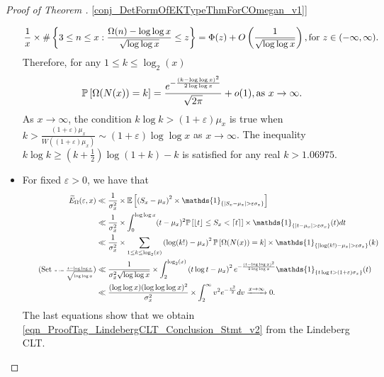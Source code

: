 \documentclass[11pt,reqno,a4letter]{article}
\newcommand{\hlocalref}[1]{\hyperref[#1]{\ref{#1}}}
\numberwithin{equation}{section}
\numberwithin{figure}{section}
\numberwithin{table}{section}
\newcommand{\floor}[1]{\left\lfloor #1 \right\rfloor}
\newcommand{\ceiling}[1]{\left\lceil #1 \right\rceil}
\theoremstyle{plain}
\numberwithin{theorem}{section}
\theoremstyle{definition}
\theoremstyle{remark}
\newcommand{\mathtext}[1]{\text{\rm #1}}
\begin{document}
\begin{proof}[Proof of Theorem \hlocalref{conj_DetFormOfEKTypeThmForCOmegan_v1}]
\begin{itemize}
\cite[Thm.~7.21; \S 7.4]{MV} 
\[
\frac{1}{x} \times \#\left\{3 \leq n \leq x: \frac{\Omega(n) - \log\log x}{\sqrt{\log\log x}} \leq z\right\} = 
     \Phi(z) + O\left(\frac{1}{\sqrt{\log\log x}}\right), \mathtext{ for } z \in (-\infty, \infty). 
\]
Therefore, for any $1 \leq k \leq \log_2(x)$ 
\[
\mathbb{P}\left[\Omega(N(x)) = k\right] = 
     \frac{e^{-\frac{(k-\log\log x)^2}{2\log\log x}}}{\sqrt{2\pi}} + o(1), 
     \mathtext{ as } x \rightarrow \infty. 
\]
As $x \rightarrow \infty$, the condition $k\log k > (1+\varepsilon) \mu_x$ is true when 
$k > \frac{(1+\varepsilon) \mu_x}{W\left((1+\varepsilon) \mu_x\right)} \sim (1+\varepsilon) \log\log x$ 
as $x \rightarrow \infty$. 
The inequality $k\log k \geq \left(k + \frac{1}{2}\right) \log(1+k) - k$ 
is satisfied for any real $k > 1.06975$. 
\item 
For fixed $\varepsilon > 0$, we have that 
\begin{align*}
\widetilde{E}_{\Omega}(\varepsilon, x) & \ll 
     \frac{1}{\sigma_x^2} \times \mathbb{E}\left[
     \left(S_x - \mu_x\right)^2 \times \mathds{1}_{\left\{\left\lvert S_x - \mu_x \right\rvert > \varepsilon\sigma_x\right\}}
     \right] \\ 
     & \ll \frac{1}{\sigma_x^2} \times 
     \int_0^{\log\log x} (t - \mu_x)^2 \mathbb{P}\left[\floor{t} \leq S_x < \ceiling{t}\right] \times 
     \mathds{1}_{\left\{\left\lvert t - \mu_x \right\rvert > \varepsilon\sigma_x\right\}}(t) dt \\
     & \ll  \frac{1}{\sigma_x^2} \times 
     \sum_{1 \leq k \leq \log_2(x)} \left(\log(k!) - \mu_x\right)^2 \mathbb{P}\left[\Omega(N(x)) = k\right] \times 
     \mathds{1}_{\left\{\left\lvert \log(k!)  - \mu_x \right\rvert > \varepsilon\sigma_x\right\}}(k) \\ 
\tag{Set {\tiny$v := \frac{t - \log\log x}{\sqrt{\log\log x}}$}}
     & \ll \frac{1}{\sigma_x^2 \sqrt{\log\log x}} \times 
     \int_2^{\log_2(x)} \left(t \log t - \mu_x\right)^2 e^{-\frac{(t-\log\log x)^2}{2\log\log x}} 
     \mathds{1}_{\left\{t \log t > (1 + \varepsilon)\sigma_x\right\}}(t) \\ 
     & \ll \frac{(\log\log x)(\log\log\log x)^2}{\sigma_x^2} \times 
     \int_2^{\infty} v^2 e^{-\frac{v^2}{2}} dv \xrightarrow{x \rightarrow \infty} 0. 
\end{align*} 
The last equations show that we obtain 
\eqref{eqn_ProofTag_LindebergCLT_Conclusion_Stmt_v2} from the 
Lindeberg CLT. 
\qedhere
\end{itemize}
\end{proof}
\end{document}
